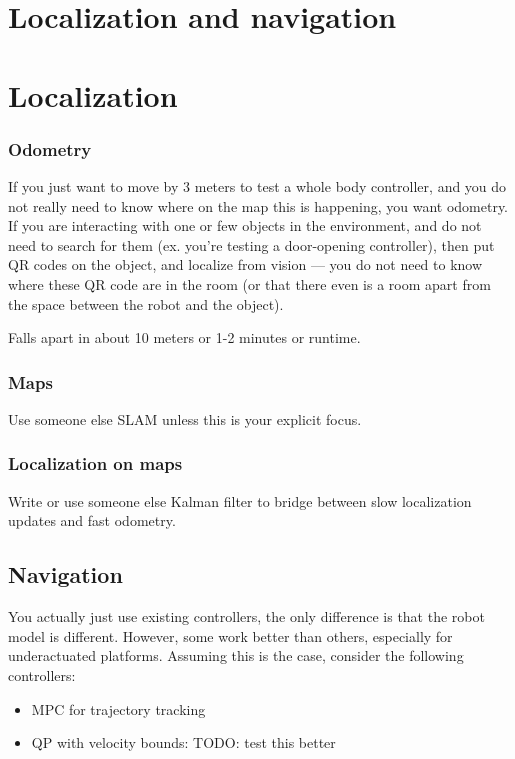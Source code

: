 \section{Localization and navigation}
\section{Localization}
\subsubsection{Odometry}
If you just want to move by 3 meters to test a whole body controller,
and you do not really need to know where on the map this is happening,
you want odometry. If you are interacting with one or few objects in the environment,
and do not need to search for them (ex. you're testing a door-opening controller),
then put QR codes on the object, and localize from vision ---
you do not need to know where these QR code are in the room (or that there even is a room apart
from the space between the robot and the object).

Falls apart in about 10 meters or 1-2 minutes or runtime.

\subsubsection{Maps}
Use someone else SLAM unless this is your explicit focus.

\subsubsection{Localization on maps}
Write or use someone else Kalman filter to bridge between slow localization updates
and fast odometry.

\subsection{Navigation}
You actually just use existing controllers,
the only difference is that the robot model is different.
However, some work better than others,
especially for underactuated platforms.
Assuming this is the case, consider the following controllers:
\begin{itemize}
		\item MPC for trajectory tracking
		\item QP with velocity bounds: TODO: test this better
\end{itemize}
